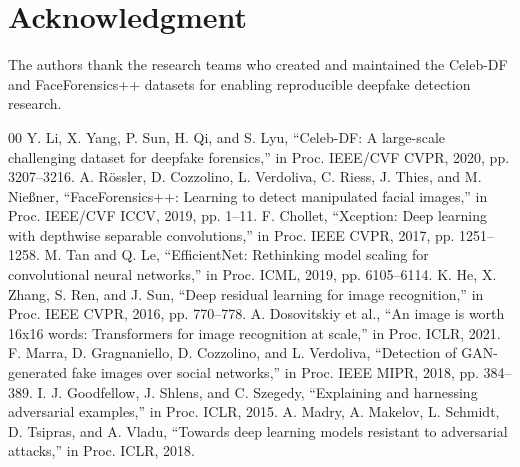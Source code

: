 \documentclass[runningheads]{llncs}
\begin{document}
\section*{Acknowledgment}
The authors thank the research teams who created and maintained the Celeb-DF and FaceForensics++ datasets for enabling reproducible deepfake detection research.

\begin{thebibliography}{00}
 Y. Li, X. Yang, P. Sun, H. Qi, and S. Lyu, ``Celeb-DF: A large-scale challenging dataset for deepfake forensics,'' in Proc. IEEE/CVF CVPR, 2020, pp. 3207--3216.
 A. R\"ossler, D. Cozzolino, L. Verdoliva, C. Riess, J. Thies, and M. Nie{\ss}ner, ``FaceForensics++: Learning to detect manipulated facial images,'' in Proc. IEEE/CVF ICCV, 2019, pp. 1--11.
 F. Chollet, ``Xception: Deep learning with depthwise separable convolutions,'' in Proc. IEEE CVPR, 2017, pp. 1251--1258.
 M. Tan and Q. Le, ``EfficientNet: Rethinking model scaling for convolutional neural networks,'' in Proc. ICML, 2019, pp. 6105--6114.
 K. He, X. Zhang, S. Ren, and J. Sun, ``Deep residual learning for image recognition,'' in Proc. IEEE CVPR, 2016, pp. 770--778.
 A. Dosovitskiy et al., ``An image is worth 16x16 words: Transformers for image recognition at scale,'' in Proc. ICLR, 2021.
 F. Marra, D. Gragnaniello, D. Cozzolino, and L. Verdoliva, ``Detection of GAN-generated fake images over social networks,'' in Proc. IEEE MIPR, 2018, pp. 384--389.
 I. J. Goodfellow, J. Shlens, and C. Szegedy, ``Explaining and harnessing adversarial examples,'' in Proc. ICLR, 2015.
 A. Madry, A. Makelov, L. Schmidt, D. Tsipras, and A. Vladu, ``Towards deep learning models resistant to adversarial attacks,'' in Proc. ICLR, 2018.
\end{thebibliography}
\end{document}
